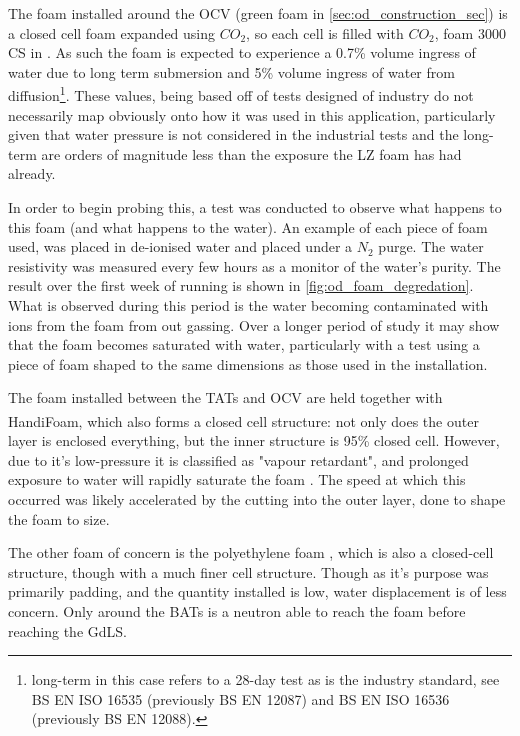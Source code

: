 \par
The foam installed around the OCV (green foam in \autoref{sec:od_construction_sec}) is a closed cell foam expanded using $CO_2$, so each cell is filled with $CO_2$, foam 3000 CS in \cite{styrodur_water_ingress_ref}.
As such the foam is expected to experience a 0.7\% volume ingress of water due to long term submersion and 5\% volume ingress of water from diffusion\footnote{long-term in this case refers to a 28-day test as is the industry standard, see BS EN ISO 16535 (previously BS EN 12087) and BS EN ISO 16536 (previously BS EN 12088).}.
These values, being based off of tests designed of industry do not necessarily map obviously onto how it was used in this application, particularly given that water pressure is not considered in the industrial tests and the long-term are orders of magnitude less than the exposure the LZ foam has had already.
\par
In order to begin probing this, a test was conducted to observe what happens to this foam (and what happens to the water).
An example of each piece of foam used, was placed in de-ionised water and placed under a $N_2$ purge. 
The water resistivity was measured every few hours as a monitor of the water's purity.
The result over the first week of running is shown in \autoref{fig:od_foam_degredation}.
What is observed during this period is the water becoming contaminated with ions from the foam from out gassing.
Over a longer period of study it may show that the foam becomes saturated with water, particularly with a test using a piece of foam shaped to the same dimensions as those used in the installation.
\par
The foam installed between the TATs and OCV are held together with HandiFoam\textsuperscript{\textregistered}, which also forms a closed cell structure: not only does the outer layer is enclosed everything, but the inner structure is 95\% closed cell.
However, due to it's low-pressure it is classified as "vapour retardant", and prolonged exposure to water will rapidly saturate the foam \cite{handifoam_water_ingress_ref}.
The speed at which this occurred was likely accelerated by the cutting into the outer layer, done to shape the foam to size.
\par
The other foam of concern is the polyethylene foam \cite{white_foam_ref}, which is also a closed-cell structure, though with a much finer cell structure.
Though as it's purpose was primarily padding, and the quantity installed is low, water displacement is of less concern.
Only around the BATs is a neutron able to reach the foam before reaching the GdLS.

